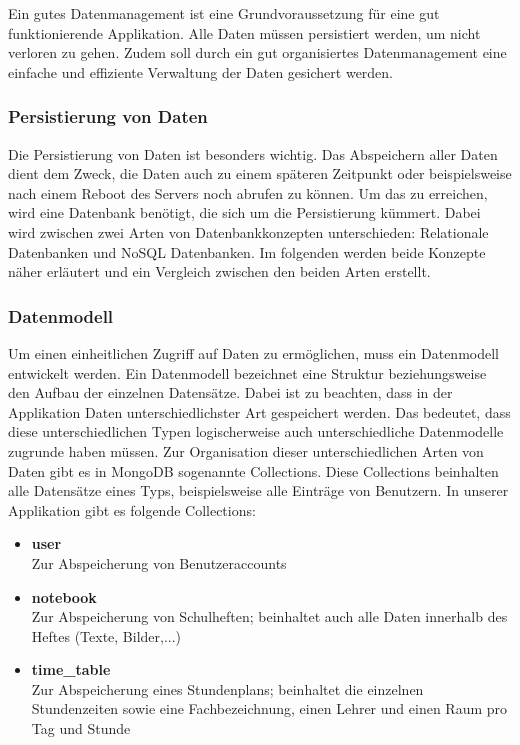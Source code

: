
Ein gutes Datenmanagement ist eine Grundvoraussetzung für eine
gut funktionierende Applikation. Alle Daten müssen persistiert werden, um nicht verloren zu gehen. Zudem soll durch ein gut organisiertes Datenmanagement eine einfache und effiziente Verwaltung der Daten gesichert werden.

\subsubsection{Persistierung von Daten}
Die Persistierung von Daten ist besonders wichtig. Das Abspeichern aller Daten dient dem Zweck, die Daten auch zu einem späteren Zeitpunkt oder beispielsweise nach einem Reboot des Servers noch abrufen zu können. Um das zu erreichen, wird eine Datenbank benötigt, die sich um die Persistierung kümmert. Dabei wird zwischen zwei Arten von Datenbankkonzepten unterschieden: Relationale Datenbanken und NoSQL Datenbanken. Im folgenden werden beide Konzepte näher erläutert und ein Vergleich zwischen den beiden Arten erstellt.

\subsubsection{Datenmodell}
Um einen einheitlichen Zugriff auf Daten zu ermöglichen, muss ein Datenmodell entwickelt werden. Ein Datenmodell bezeichnet eine Struktur beziehungsweise den Aufbau der einzelnen Datensätze. Dabei ist zu beachten, dass in der Applikation Daten unterschiedlichster Art gespeichert werden. Das bedeutet, dass diese unterschiedlichen Typen logischerweise auch unterschiedliche Datenmodelle zugrunde haben müssen. Zur Organisation dieser unterschiedlichen Arten von Daten gibt es in MongoDB sogenannte Collections. Diese Collections beinhalten alle Datensätze eines Typs, beispielsweise alle Einträge von Benutzern. In unserer Applikation gibt es folgende Collections:
\begin{itemize}
\item \textbf{user}\\ Zur Abspeicherung von Benutzeraccounts
\item \textbf{notebook}\\ Zur Abspeicherung von Schulheften; beinhaltet auch alle Daten innerhalb des Heftes (Texte, Bilder,...)
\item \textbf{time\_table}\\ Zur Abspeicherung eines Stundenplans; beinhaltet die einzelnen Stundenzeiten sowie eine Fachbezeichnung, einen Lehrer und einen Raum pro Tag und Stunde
\end{itemize}

